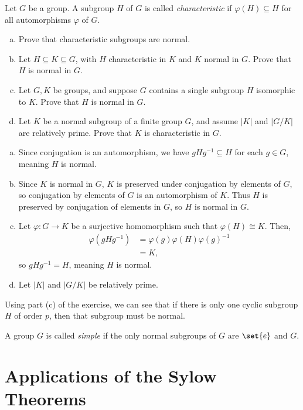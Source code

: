 \documentclass[10pt]{mypackage}
\begin{document}
\begin{exercise}
  Let $G$ be a group. A subgroup $H$ of $G$ is called \textit{characteristic} if $\varphi\left( H \right) \subseteq H$ for all automorphisms $\varphi$ of $G$.
  \begin{enumerate}[(a)]
    \item Prove that characteristic subgroups are normal.
    \item Let $H\subseteq K \subseteq G$, with $H$ characteristic in $K$ and $K$ normal in $G$. Prove that $H$ is normal in $G$.
    \item Let $G,K$ be groups, and suppose $G$ contains a single subgroup $H$ isomorphic to $K$. Prove that $H$ is normal in $G$.
    \item Let $K$ be a normal subgroup of a finite  group $G$, and assume $\left\vert K \right\vert$ and $\left\vert G/K \right\vert$ are relatively prime. Prove that $K$ is characteristic in $G$.
  \end{enumerate}
\end{exercise}
\begin{solution}\hfill
  \begin{enumerate}[(a)]
    \item Since conjugation is an automorphism, we have $gHg^{-1}\subseteq H$ for each $g\in G$, meaning $H$ is normal.
    \item Since $K$ is normal in $G$, $K$ is preserved under conjugation by elements of $G$, so conjugation by elements of $G$ is an automorphism of $K$. Thus $H$ is preserved by conjugation of elements in $G$, so $H$ is normal in $G$.
    \item Let $\varphi\colon G\rightarrow K$ be a surjective homomorphism such that $\varphi(H)\cong K$. Then, 
      \begin{align*}
        \varphi\left( gHg^{-1} \right) &= \varphi\left( g \right)\varphi\left( H \right)\varphi\left( g \right)^{-1}\\
                                       &= K,
      \end{align*}
      so $gHg^{-1} = H$, meaning $H$ is normal.
    \item Let $\left\vert K \right\vert$ and $\left\vert G/K \right\vert$ be relatively prime.
  \end{enumerate}
\end{solution}

Using part (c) of the exercise, we can see that if there is only one cyclic subgroup $H$ of order $p$, then that subgroup must be normal.
\begin{definition}
  A group $G$ is called \textit{simple} if the only normal subgroups of $G$ are $\set{e}$ and $G$.
\end{definition}

\section{Applications of the Sylow Theorems}%
\end{document}
